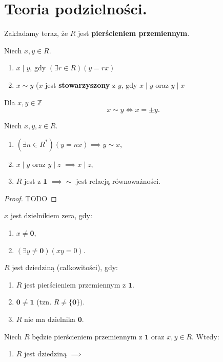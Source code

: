 \section{Teoria podzielności.}
\begin{context}

	Zakładamy teraz, że $R$ jest \textbf{pierścieniem przemiennym}.
\end{context}
\begin{definition}
	Niech $x,y \in R$. 
	\begin{enumerate}[label=\arabic*)]
		\item $x \mid y$, gdy $\left(\exists r\in R \right)\left( y = rx \right) $ 
		\item $x\sim y$ ($x$ jest \textbf{stowarzyszony} z $y$, gdy $x \mid y$ oraz $y \mid x$
	\end{enumerate}
\end{definition} 
\begin{eg}
	Dla $x,y \in \mathbb{Z} $ 
	\[
	x\sim y \iff x = \pm y 
	.\] 
\end{eg} 
\begin{fact}

	Niech $x,y,z \in R$.
	\begin{enumerate}[label=\arabic*)]
		\item $\left(\exists n \in R^{\ast}\right) \left( y = nx \right)\implies y\sim x  $,
		\item $x \mid y$ oraz $y \mid z$ $\implies x \mid z $,
		\item $R$ jest z $\mathbf{1}$ $\implies \sim  $ jest relacją równoważności.
	\end{enumerate}
\end{fact}
\begin{proof}
	TODO
\end{proof} 
\begin{definition}
	$x$ jest dzielnikiem zera, gdy:
	\begin{enumerate}[label=\arabic*)]
		\item $x\neq \mathbf{0}$,
		\item $\left(\exists y\neq \mathbf{0} \right)\left( xy =0 \right)  $.
	\end{enumerate}
\end{definition} 
\begin{definition}[Dziedzina]
	$R$ jest dziedziną (całkowitości), gdy:
	\begin{enumerate}[label=\arabic*)]
		\item $R$ jest pierścieniem przemiennym z $\mathbf{1}$.
		\item $\mathbf{0}\neq \mathbf{1}$ (tzn. $R \neq \{\mathbf{0}\}) $.
		\item $R$ nie ma dzielnika $\mathbf{0}$.
	\end{enumerate}
\end{definition} 
\begin{fact}
	Niech $R$ będzie pierścieniem przemiennym z $\mathbf{1}$ oraz $x,y \in R$. Wtedy:
	\begin{enumerate}[label=\arabic*)]
		\item $R$ jest dziedziną $\implies$ 
	\end{enumerate}
\end{fact}

